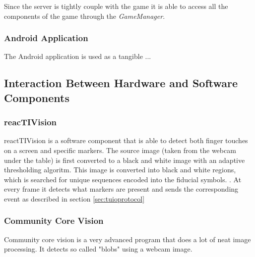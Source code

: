 \documentclass[a4paper,10pt]{article}
\begin{document}
		Since the server is tightly couple with the game it is able to access all the components of the game through the \emph{GameManager}.
		
		\subsubsection{Android Application}
		The Android application is used as a tangible ...
		
		
		
	\subsection{Interaction Between Hardware and Software Components}
	

		\subsubsection{reacTIVision}
		\label{sec:reactivision}
		reactTIVision is a software component that is able to detect both finger touches on a screen and specific markers. 
		The source image (taken from the webcam under the table) is first converted to a black and white image with an adaptive thresholding algoritm. 
		This image is converted into black and white regions, which is searched for unique sequences encoded into the fiducial symbols. \cite{reactivision}.
		At every frame it detects what markers are present and sends the corresponding event as described in section \ref{sec:tuioprotocol}
		
		\subsubsection{Community Core Vision}
		\label{sec:communitycorevision}	
		Community core vision is a very advanced program that does a lot of neat image processing. 
		It detects so called "blobs" using a webcam image. 
\end{document}
